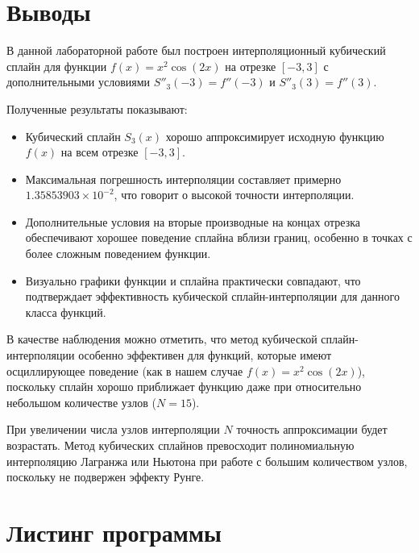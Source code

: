 \documentclass[12pt]{article}
\begin{document}
\section{Выводы}

В данной лабораторной работе был построен интерполяционный кубический сплайн для функции $f(x) = x^2\cos(2x)$ на отрезке $[-3, 3]$ с дополнительными условиями $S''_3(-3) = f''(-3)$ и $S''_3(3) = f''(3)$.

Полученные результаты показывают:
\begin{itemize}
    \item Кубический сплайн $S_3(x)$ хорошо аппроксимирует исходную функцию $f(x)$ на всем отрезке $[-3, 3]$.
    \item Максимальная погрешность интерполяции составляет примерно $1.35853903 \times 10^{-2}$, что говорит о высокой точности интерполяции.
    \item Дополнительные условия на вторые производные на концах отрезка обеспечивают хорошее поведение сплайна вблизи границ, особенно в точках с более сложным поведением функции.
    \item Визуально графики функции и сплайна практически совпадают, что подтверждает эффективность кубической сплайн-интерполяции для данного класса функций.
\end{itemize}

В качестве наблюдения можно отметить, что метод кубической сплайн-интерполяции особенно эффективен для функций, которые имеют осциллирующее поведение (как в нашем случае $f(x) = x^2\cos(2x)$), поскольку сплайн хорошо приближает функцию даже при относительно небольшом количестве узлов ($N = 15$).

При увеличении числа узлов интерполяции $N$ точность аппроксимации будет возрастать. Метод кубических сплайнов превосходит полиномиальную интерполяцию Лагранжа или Ньютона при работе с большим количеством узлов, поскольку не подвержен эффекту Рунге.

\section{Листинг программы}
\end{document}
